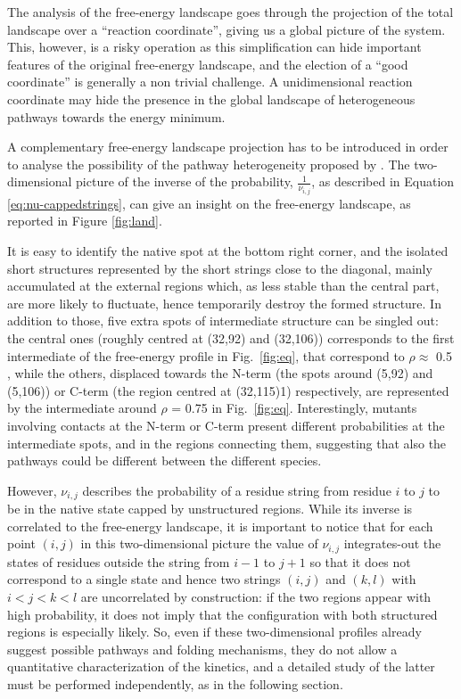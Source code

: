 The analysis of the free-energy landscape goes through the projection of the
total landscape over a ``reaction coordinate'', giving us a global picture of
the system. 
This, however, is a risky operation as this simplification can hide important
features of the original free-energy landscape, and the election of a ``good
coordinate'' is generally a non trivial challenge.
A unidimensional reaction coordinate may hide the presence in the global landscape
of heterogeneous pathways towards the energy minimum.

A complementary free-energy landscape projection has to be introduced in order
to analyse the possibility of the pathway heterogeneity proposed by \citet{Lowe2007}.
The two-dimensional picture of the inverse of the probability,
$\frac1{\nu_{i,j}}$, as described in Equation \ref{eq:nu-cappedstrings}, can give an insight
on the free-energy landscape, as reported in Figure \ref{fig:land}.

It is easy to identify the native spot at the bottom right corner, and the
isolated short structures represented by the short strings close to the
diagonal, mainly accumulated at the external regions which, as less stable than
the central part, are more likely to fluctuate, hence temporarily destroy the
formed structure. 
In addition to those, five extra spots of intermediate structure can
be singled out: the
central ones (roughly centred  at (32,92) and (32,106)) corresponds to the
first intermediate of the free-energy profile in Fig.~\ref{fig:eq}, that
correspond to $\rho \approx$ 0.5 , while the
others, displaced towards the N-term (the spots around (5,92) and (5,106)) or
C-term (the region centred at (32,115)1) respectively, are represented by the
intermediate around $\rho$ = 0.75 in Fig.~\ref{fig:eq}. Interestingly, mutants
involving contacts at the N-term or C-term present different probabilities at
the intermediate spots, and in the regions connecting them, suggesting that also
the pathways could be different between the different species.

However, $\nu_{i,j}$ describes the probability of a residue string from residue $i$ to
$j$ to be in the native state capped by unstructured regions.
While its inverse is correlated to the free-energy landscape, it is important to
notice that for each point $(i,j)$ in this two-dimensional picture the value of
$\nu_{i,j}$ integrates-out the states of residues outside the string from $i-1$
to $j+1$ so that it does not correspond to a single state and hence two strings
$(i,j)$ and $(k,l)$ with $i<j<k<l$ are uncorrelated by construction: if the two
regions appear with high probability, it does not imply that the configuration
with both structured regions is especially likely.
So, even if these two-dimensional
profiles already suggest possible pathways and folding mechanisms, they do not
allow a quantitative characterization of the kinetics, and a detailed study of
the latter must be performed independently, as in the following section.


